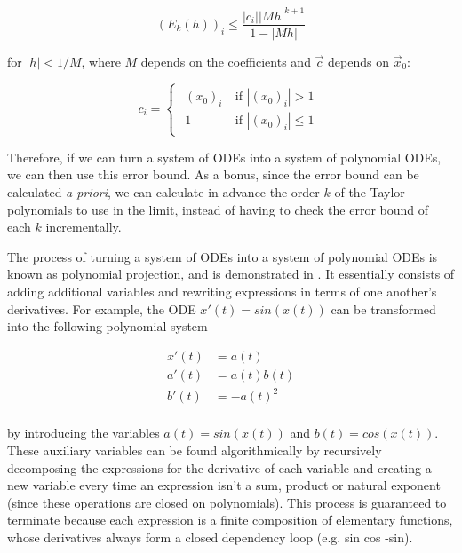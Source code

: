 \begin{equation}
\label{eq:poly_ode_error}
(E_k(h))_i \leq \frac{|c_i| |Mh|^{k+1}}{1-|Mh|}
\end{equation}

for $|h| < 1/M$, where $M$ depends on the coefficients and $\vec{c}$ depends on $\vec{x}_0$:

\begin{equation*}
  c_i = 
  \begin{cases}
    \begin{aligned}
      (x_0)_i \ &\text{if } |(x_0)_i| >    1 \\
      1       \ &\text{if } |(x_0)_i| \leq 1
    \end{aligned}
  \end{cases}
\end{equation*}

Therefore, if we can turn a system of ODEs into a system of polynomial ODEs, we can then use this error bound. As a bonus, since the error bound can be calculated \textit{a priori}, we can calculate in advance the order $k$ of the Taylor polynomials to use in the limit, instead of having to check the error bound of each $k$ incrementally.

The process of turning a system of ODEs into a system of polynomial ODEs is known as polynomial projection, and is demonstrated in \cite{WARNE20061695}. It essentially consists of adding additional variables and rewriting expressions in terms of one another's derivatives. For example, the ODE $x'(t) = sin(x(t))$ can be transformed into the following polynomial system

\begin{equation*}
  \begin{split}
    x'(t) &= a(t) \\
    a'(t) &= a(t)b(t) \\
    b'(t) &= -a(t)^2 \\
  \end{split}
\end{equation*}

by introducing the variables $a(t) = sin(x(t))$ and $b(t) = cos(x(t))$. These auxiliary variables can be found algorithmically by recursively decomposing the expressions for the derivative of each variable and creating a new variable every time an expression isn't a sum, product or natural exponent (since these operations are closed on polynomials). This process is guaranteed to terminate because each expression is a finite composition of elementary functions, whose derivatives always form a closed dependency loop (e.g. sin \rightarrow cos \rightarrow -sin).

